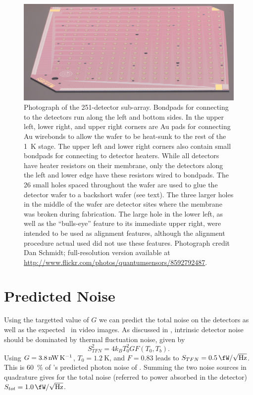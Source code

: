 \begin{figure}
\centering
\includegraphics[width=6.5in]{images/ch5-full-wafer.jpg}
\caption{
  Photograph of the 251-detector sub-array.
  Bondpads for connecting to the detectors run along the left and bottom sides.
  In the upper left, lower right, and upper right corners are Au pads for connecting Au wirebonds to allow the wafer to be heat-sunk to the rest of the \SI{1}{\K} stage.
  The upper left and lower right corners also contain small bondpads for connecting to detector heaters.
  While all detectors have heater resistors on their membrane, only the detectors along the left and lower edge have these resistors wired to bondpads.
  The 26 small holes spaced throughout the wafer are used to glue the detector wafer to a backshort wafer (see text).
  The three larger holes in the middle of the wafer are detector sites where the membrane was broken during fabrication.
  The large hole in the lower left, as well as the ``bulls-eye'' feature to its immediate upper right, were intended to be used as alignment features, although the alignment procedure actual used did not use these features.
  Photograph credit Dan Schmidt; full-resolution version available at \protect\url{http://www.flickr.com/photos/quantumsensors/8592792487}.
}
\label{fig:ch5-full-wafer}
\end{figure}

\section{Predicted Noise} \label{sec:ch5-predicted-noise}

Using the targetted value of $G$ we can predict the total noise on the detectors as well as the expected \NETD\ in video images.
As discussed in , intrinsic detector noise should be dominated by thermal fluctuation noise, given by
\begin{equation}
  S^2_{TFN} = 4 k_B T_0^2 G F(T_0, T_b).
\end{equation}
Using $G = \SI{3.8}{\nW\per\K}$, $T_0 = \SI{1.2}{\K}$, and $F = 0.83$ leads to $S_{TFN} = \Pnoisef{0.5}$.
This is \SI{60}{\percent} of 's predicted photon noise of .
Summing the two noise sources in quadrature gives for the total noise (referred to power absorbed in the detector) $S_{tot} = \Pnoisef{1.0}$.

